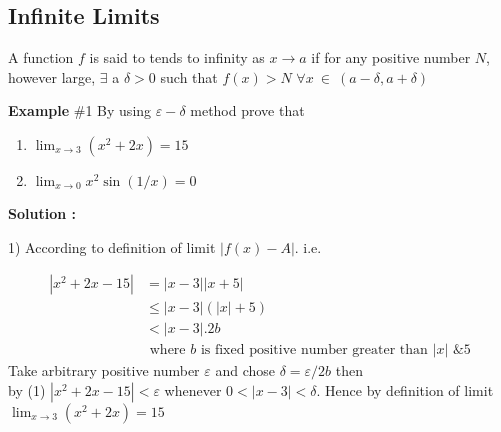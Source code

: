 \documentclass[10pt,a4paper]{article}
\begin{document}
\subsection{Infinite Limits}
A function $f$ is said to tends to infinity as $x \to a$ if for any positive number $N$, however large, $\exists$ a $\delta > 0 $ such that $f(x) > N$ $\forall x~\in~(a-\delta,a+\delta)$
\par \vspace{1em}
\textbf{Example }\#1 By using $\varepsilon-\delta$ method prove that 
\begin{enumerate}
\item $\displaystyle{\lim_{x \to 3}} (x^2 + 2x)= 15$
\item $\displaystyle{\lim_{x \to 0}} x^2\sin(1/x)=0$
\end{enumerate}
\textbf{Solution :} \par 1) According to definition of limit $|f(x)-A|$. i.e. \par 
\begin{equation}
\begin{split}
|x^2+2x-15| & =|x-3||x+5| \\ &\leq |x-3|(|x|+5) \\ & <|x-3|.2b \\ &\text{ where $b$ is fixed positive number greater than $|x|$ \& $5$}
\end{split} 
\end{equation}
Take arbitrary positive number $\varepsilon$ and chose $\delta=\varepsilon/2b$  then \\ by (1)
 $|x^2+2x-15|<\varepsilon$ whenever $0<|x-3|<\delta$.
Hence by definition of limit $\displaystyle{\lim_{x \to 3}} (x^2 + 2x)= 15$\\
\end{document}
